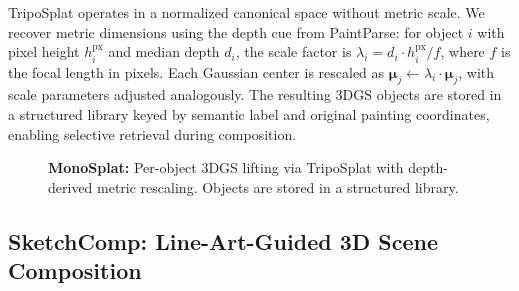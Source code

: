 TripoSplat operates in a normalized canonical space without metric scale. We
recover metric dimensions using the depth cue from PaintParse: for object $i$
with pixel height $h_i^\text{px}$ and median depth $d_i$, the scale factor is
$\lambda_i = d_i \cdot h_i^\text{px} / f$, where $f$ is the focal length in
pixels. Each Gaussian center is rescaled as
$\boldsymbol{\mu}_j \leftarrow \lambda_i \cdot \boldsymbol{\mu}_j$, with scale
parameters adjusted analogously. The resulting 3DGS objects are stored in a
structured library keyed by semantic label and original painting coordinates,
enabling selective retrieval during composition.

\begin{figure}[t]
    \centering
    \caption{\textbf{MonoSplat:} Per-object 3DGS lifting via TripoSplat with
    depth-derived metric rescaling. Objects are stored in a structured library.}
    \label{fig:monosplat}
\end{figure}

\subsection{SketchComp: Line-Art-Guided 3D Scene Composition}
\label{sec:method:sketchcomp}

